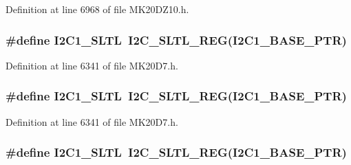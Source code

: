 Definition at line 6968 of file M\+K20\+D\+Z10.\+h.

\subsubsection[{\texorpdfstring{I2\+C1\+\_\+\+S\+L\+TL}{I2C1_SLTL}}]{\setlength{\rightskip}{0pt plus 5cm}\#define I2\+C1\+\_\+\+S\+L\+TL~{\bf I2\+C\+\_\+\+S\+L\+T\+L\+\_\+\+R\+EG}({\bf I2\+C1\+\_\+\+B\+A\+S\+E\+\_\+\+P\+TR})}\hypertarget{group___i2_c___register___accessor___macros_ga1d6d67136378cdc43250d350dde35366}{}\label{group___i2_c___register___accessor___macros_ga1d6d67136378cdc43250d350dde35366}


Definition at line 6341 of file M\+K20\+D7.\+h.

\subsubsection[{\texorpdfstring{I2\+C1\+\_\+\+S\+L\+TL}{I2C1_SLTL}}]{\setlength{\rightskip}{0pt plus 5cm}\#define I2\+C1\+\_\+\+S\+L\+TL~{\bf I2\+C\+\_\+\+S\+L\+T\+L\+\_\+\+R\+EG}({\bf I2\+C1\+\_\+\+B\+A\+S\+E\+\_\+\+P\+TR})}\hypertarget{group___i2_c___register___accessor___macros_ga1d6d67136378cdc43250d350dde35366}{}\label{group___i2_c___register___accessor___macros_ga1d6d67136378cdc43250d350dde35366}


Definition at line 6341 of file M\+K20\+D7.\+h.

\subsubsection[{\texorpdfstring{I2\+C1\+\_\+\+S\+L\+TL}{I2C1_SLTL}}]{\setlength{\rightskip}{0pt plus 5cm}\#define I2\+C1\+\_\+\+S\+L\+TL~{\bf I2\+C\+\_\+\+S\+L\+T\+L\+\_\+\+R\+EG}({\bf I2\+C1\+\_\+\+B\+A\+S\+E\+\_\+\+P\+TR})}\hypertarget{group___i2_c___register___accessor___macros_ga1d6d67136378cdc43250d350dde35366}{}\label{group___i2_c___register___accessor___macros_ga1d6d67136378cdc43250d350dde35366}


